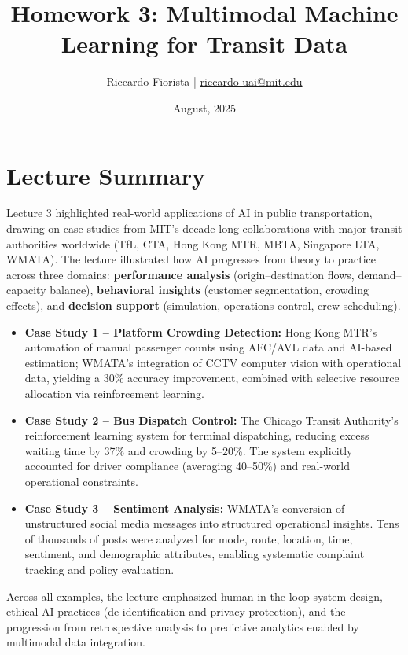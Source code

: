 \documentclass[11pt]{article}
\title{Homework 3: Multimodal Machine Learning for Transit Data}
\author{Riccardo Fiorista | \href{mailto:riccardo-uai@mit.edu}{riccardo-uai@mit.edu}}
\date{August, 2025}
\begin{document}
\maketitle
\thispagestyle{fancy}

\section*{Lecture Summary}

Lecture 3 highlighted real-world applications of AI in public transportation, drawing on case studies from MIT’s decade-long collaborations with major transit authorities worldwide (TfL, CTA, Hong Kong MTR, MBTA, Singapore LTA, WMATA). The lecture illustrated how AI progresses from theory to practice across three domains:  
\textbf{performance analysis} (origin–destination flows, demand–capacity balance),  
\textbf{behavioral insights} (customer segmentation, crowding effects), and  
\textbf{decision support} (simulation, operations control, crew scheduling).

\begin{itemize}
    \item \textbf{Case Study 1 – Platform Crowding Detection:} Hong Kong MTR’s automation of manual passenger counts using AFC/AVL data and AI-based estimation; WMATA’s integration of CCTV computer vision with operational data, yielding a 30\% accuracy improvement, combined with selective resource allocation via reinforcement learning.

    \item \textbf{Case Study 2 – Bus Dispatch Control:} The Chicago Transit Authority’s reinforcement learning system for terminal dispatching, reducing excess waiting time by 37\% and crowding by 5–20\%. The system explicitly accounted for driver compliance (averaging 40–50\%) and real-world operational constraints.

    \item \textbf{Case Study 3 – Sentiment Analysis:} WMATA’s conversion of unstructured social media messages into structured operational insights. Tens of thousands of posts were analyzed for mode, route, location, time, sentiment, and demographic attributes, enabling systematic complaint tracking and policy evaluation.
\end{itemize}

Across all examples, the lecture emphasized human-in-the-loop system design, ethical AI practices (de-identification and privacy protection), and the progression from retrospective analysis to predictive analytics enabled by multimodal data integration.
\end{document}
